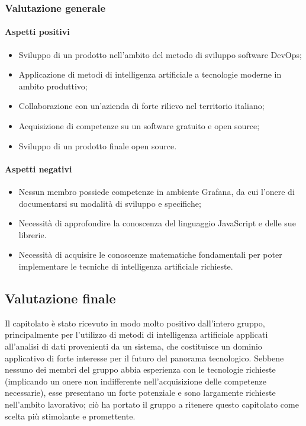 	\subsubsection{Valutazione generale}
	\paragraph{Aspetti positivi}
	\begin{itemize}
		\item{Sviluppo di un prodotto nell'ambito del metodo di sviluppo software DevOps;}
		\item{Applicazione di metodi di intelligenza artificiale a tecnologie moderne in ambito produttivo;}
		\item{Collaborazione con un'azienda di forte rilievo nel territorio italiano;}
		\item{Acquisizione di competenze su un software gratuito e open source;}
		\item{Sviluppo di un prodotto finale open source.}
	\end{itemize}
	\paragraph{Aspetti negativi}	
	\begin{itemize}
		\item{Nessun membro possiede competenze in ambiente Grafana, da cui l'onere di documentarsi su modalità di sviluppo e  specifiche;} 
		\item{Necessità di approfondire la conoscenza del linguaggio JavaScript e delle sue librerie.}
		\item{Necessità di acquisire le conoscenze matematiche fondamentali per poter implementare le tecniche di intelligenza artificiale richieste.}
	\end{itemize} 
	\subsection{Valutazione finale}
	
	Il capitolato è stato ricevuto in modo molto positivo dall'intero gruppo, principalmente per l'utilizzo di metodi di intelligenza artificiale applicati all'analisi di dati provenienti da un sistema, che costituisce un dominio applicativo di forte interesse per il futuro del panorama tecnologico. Sebbene nessuno dei membri del gruppo abbia esperienza con le tecnologie richieste (implicando un onere non indifferente nell'acquisizione delle competenze necessarie), esse presentano un forte potenziale e sono largamente richieste nell'ambito lavorativo; ciò ha portato il gruppo a ritenere questo capitolato come scelta più stimolante e promettente.
	\pagebreak		
	
